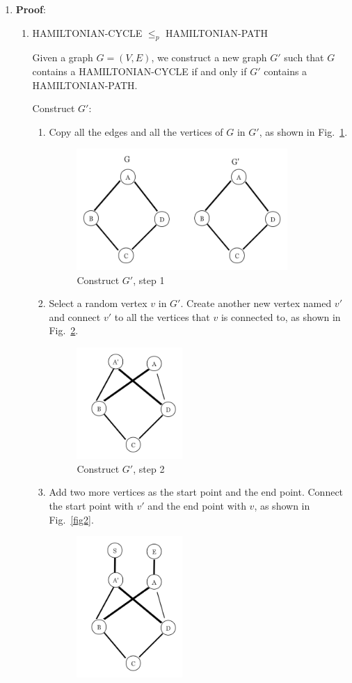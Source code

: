 \documentclass[12pt,a4paper]{article}
\makeatletter
\newtheorem*{solution}{Solution}
\theoremstyle{definition}
\renewenvironment{solution}[1][Solution] {\par\pushQED{\qed}\normalfont\topsep6\p@\@plus6\p@\relax\trivlist\item[\hskip\labelsep\bfseries#1\@addpunct{.}]\ignorespaces}{\popQED\endtrivlist\@endpefalse} \makeatother
\makeatother
\begin{document}
\begin{enumerate}
\begin{solution}
\textbf{Proof}:
\begin{enumerate}
    \item HAMILTONIAN-CYCLE $\leq_p$ HAMILTONIAN-PATH
    
    Given a graph $G=(V,E)$, we construct a new graph $G'$ such that $G$ contains a HAMILTONIAN-CYCLE if and only if $G'$ contains a HAMILTONIAN-PATH.
    
    Construct $G'$:
    \begin{enumerate}
    \item Copy all the edges and all the vertices of $G$ in $G'$, as shown in Fig.~\ref{fig3}.
    \begin{figure}[H]
        \centering
        \includegraphics[width=8cm]{3.png}
        \caption{Construct $G'$, step 1}
        \label{fig3}
    \end{figure}
        \item Select a random vertex $v$ in $G'$. Create another new vertex named $v'$ and connect $v'$ to all the vertices that $v$ is connected to, as shown in Fig.~\ref{fig1}.
                \begin{figure}[H]
            \centering
         \includegraphics[width=4cm]{1.png}
            \caption{Construct $G'$, step 2}
          \label{fig1}
        \end{figure}
        \item Add two more vertices as the start point and the end point. Connect the start point with $v'$ and the end point with $v$, as shown in Fig.~\ref{fig2}.
        \begin{figure}[H]
            \centering
            \includegraphics[width=4cm]{2.png}

\end{figure}
\end{enumerate}
\end{enumerate}
\end{solution}
\end{enumerate}
\end{document}
